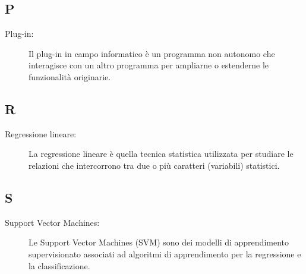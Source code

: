 \documentclass[../manuale-sviluppatore.tex]{subfiles}
\begin{document}
\subsection*{P}
\begin{description}
  \item[Plug-in:] Il plug-in in campo informatico è un programma non autonomo che interagisce con un altro programma per ampliarne o estenderne le funzionalità originarie.
\end{description}

\subsection*{R}
\begin{description}
  \item[Regressione lineare:] La regressione lineare è quella tecnica statistica utilizzata per studiare le relazioni che intercorrono tra due o più caratteri (variabili) statistici.  
\end{description}

\subsection*{S}
\begin{description}
  \item[Support Vector Machines:] Le Support Vector Machines (SVM) sono dei modelli di apprendimento supervisionato associati ad algoritmi di apprendimento per la regressione e la classificazione.
\end{description}
\end{document}

